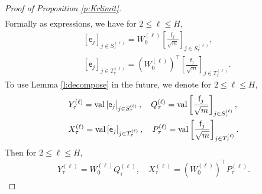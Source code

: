 \documentclass{article}
\numberwithin{equation}{section}
\newcommand{\sfe}{{\mathsf e}}
\newcommand{\sff}{{\mathsf f}}
\renewcommand{\leq}{\leqslant}
\newcommand{\1}{\mathds{1}}
\theoremstyle{plain} %
\newcommand{\val}{{\rm val}}
\begin{document}
\begin{proof}[Proof of Proposition \ref{p:Krlimit}]
\begin{align*}
\end{align*}
%
Formally as expressions, we have for $2\leq \ell\leq H$,
\begin{align*}
&\left[\sfe_j\right]_{j\in S^{(\ell)}_\tau}=W_0^{(\ell)}\left[\frac{\sff_j}{\sqrt m}\right]_{j\in S^{(\ell)}_\tau},\\
&\left[\sfe_j\right]_{j\in T^{(\ell)}_\tau}=(W_0^{(\ell)})^\top\left[\frac{\sff_j}{\sqrt m}\right]_{j\in T^{(\ell)}_\tau}.
\end{align*}
To use Lemma \ref{l:decompose} in the future, we denote for $2\leq \ell \leq H$,
\begin{align}\begin{split}\label{e:defYQXP}
&Y_\tau^{(\ell)}=\val\left[\sfe_j\right]_{j\in S^{(\ell)}_\tau},\quad Q_\tau^{(\ell)}=\val \left[\frac{\sff_j}{\sqrt m}\right]_{j\in S^{(\ell)}_\tau},\\
&X_\tau^{(\ell)}=
\val \left[\sfe_j\right]_{j\in T^{(\ell)}_\tau},\quad P_\tau^{(\ell)}=\val\left[\frac{\sff_j}{\sqrt m}\right]_{j\in T^{(\ell)}_\tau}.
\end{split}\end{align}
Then  for $2\leq \ell\leq H$,
\begin{align*}
Y_\tau^{(\ell)}=W_0^{(\ell)}Q_\tau^{(\ell)},\quad X_\tau^{(\ell)}=(W_0^{(\ell)})^{\top}P_\tau^{(\ell)}.
\end{align*}


\end{proof}
\end{document}
